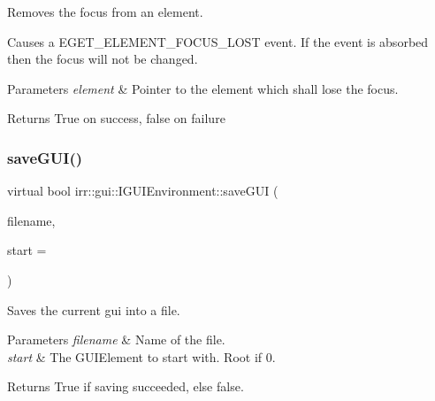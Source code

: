 Removes the focus from an element. 

Causes a E\+G\+E\+T\+\_\+\+E\+L\+E\+M\+E\+N\+T\+\_\+\+F\+O\+C\+U\+S\+\_\+\+L\+O\+ST event. If the event is absorbed then the focus will not be changed. 
\begin{DoxyParams}{Parameters}
{\em element} & Pointer to the element which shall lose the focus. \\
\hline
\end{DoxyParams}
\begin{DoxyReturn}{Returns}
True on success, false on failure 
\end{DoxyReturn}
\mbox{\label{classirr_1_1gui_1_1IGUIEnvironment_ac5e7b39ff2292983660a5e5999b240b3}} 
\subsubsection{\texorpdfstring{save\+G\+U\+I()}{saveGUI()}\hspace{0.1cm}{\footnotesize\ttfamily [1/4]}}
{\footnotesize\ttfamily virtual bool irr\+::gui\+::\+I\+G\+U\+I\+Environment\+::save\+G\+UI (\begin{DoxyParamCaption}\item[{const \hyperlink{namespaceirr_1_1io_a6468281622ce3a1c46b72e19f32dded5}{io\+::path} \&}]{filename,  }\item[{\hyperlink{classirr_1_1gui_1_1IGUIElement}{I\+G\+U\+I\+Element} $\ast$}]{start = {} }\end{DoxyParamCaption})\hspace{0.3cm}{\ttfamily [pure virtual]}}



Saves the current gui into a file. 


\begin{DoxyParams}{Parameters}
{\em filename} & Name of the file. \\
\hline
{\em start} & The G\+U\+I\+Element to start with. Root if 0. \\
\hline
\end{DoxyParams}
\begin{DoxyReturn}{Returns}
True if saving succeeded, else false. 
\end{DoxyReturn}
\mbox{\label{classirr_1_1gui_1_1IGUIEnvironment_ac5e7b39ff2292983660a5e5999b240b3}} 
